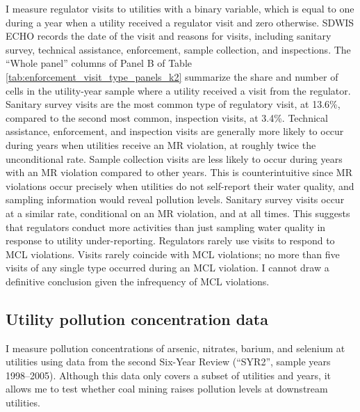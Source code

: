 \documentclass[12pt]{article}
\newcommand{\outputdir}{../../output}
\newcommand{\outsum}[1]{}
\begin{document}



I measure regulator visits to utilities with a binary variable, which is equal to one during a year when a utility received a regulator visit and zero otherwise. SDWIS ECHO records the date of the visit and reasons for visits, including sanitary survey, technical assistance, enforcement, sample collection, and inspections. The ``Whole panel'' columns of Panel B of Table \ref{tab:enforcement_visit_type_panels_k2} summarize the share and number of cells in the utility-year sample where a utility received a visit from the regulator. Sanitary survey visits are the most common type of regulatory visit, at 13.6\%, compared to the second most common, inspection visits, at 3.4\%. Technical assistance, enforcement, and inspection visits are generally more likely to occur during years when utilities receive an MR violation, at roughly twice the unconditional rate. Sample collection visits are less likely to occur during years with an MR violation compared to other years. This is counterintuitive since MR violations occur precisely when utilities do not self-report their water quality, and sampling information would reveal pollution levels. Sanitary survey visits occur at a similar rate, conditional on an MR violation, and at all times. This suggests that regulators conduct more activities than just sampling water quality in response to utility under-reporting. Regulators rarely use visits to respond to MCL violations. Visits rarely coincide with MCL violations; no more than five visits of any single type occurred during an MCL violation. I cannot draw a definitive conclusion given the infrequency of MCL violations.

\subsection{Utility pollution concentration data}

I measure pollution concentrations of arsenic, nitrates, barium, and selenium at utilities using data from the second Six-Year Review (``SYR2'', sample years 1998--2005). Although this data only covers a subset of utilities and years, it allows me to test whether coal mining raises pollution levels at downstream utilities.
\end{document}
